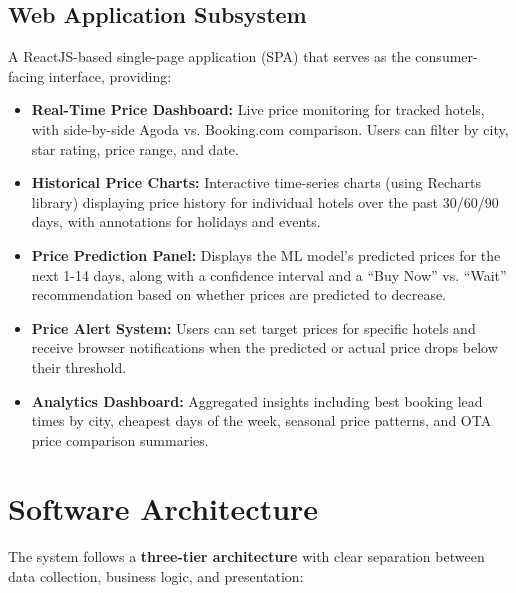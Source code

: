 \documentclass[12pt,a4paper]{report}
\begin{document}
\subsection{Web Application Subsystem}

A ReactJS-based single-page application (SPA) that serves as the consumer-facing interface, providing:

\begin{itemize}
    \item \textbf{Real-Time Price Dashboard:} Live price monitoring for tracked hotels, with side-by-side Agoda vs. Booking.com comparison. Users can filter by city, star rating, price range, and date.
    \item \textbf{Historical Price Charts:} Interactive time-series charts (using Recharts library) displaying price history for individual hotels over the past 30/60/90 days, with annotations for holidays and events.
    \item \textbf{Price Prediction Panel:} Displays the ML model's predicted prices for the next 1-14 days, along with a confidence interval and a ``Buy Now'' vs. ``Wait'' recommendation based on whether prices are predicted to decrease.
    \item \textbf{Price Alert System:} Users can set target prices for specific hotels and receive browser notifications when the predicted or actual price drops below their threshold.
    \item \textbf{Analytics Dashboard:} Aggregated insights including best booking lead times by city, cheapest days of the week, seasonal price patterns, and OTA price comparison summaries.
\end{itemize}

\section{Software Architecture}

The system follows a \textbf{three-tier architecture} with clear separation between data collection, business logic, and presentation:
\end{document}

